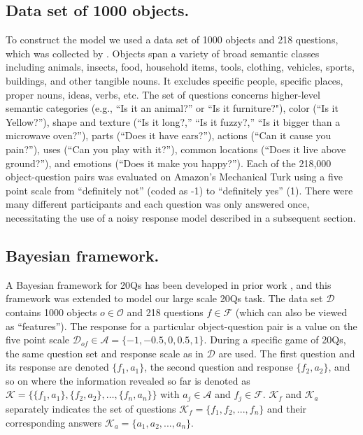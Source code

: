 \documentclass[11pt,letterpaper]{article}
\newcommand{\mc}[1]{\mathcal{#1}}
\begin{document}
\subsection* {Data set of 1000 objects.}
To construct the model we used a data set of 1000 objects and 218 questions, which was collected by \cite{Palatucci2009}.
Objects span a variety of broad semantic classes including animals, insects, food, household items, tools, clothing, vehicles, sports, buildings, and other tangible nouns.
It excludes specific people, specific places, proper nouns, ideas, verbs, etc.
The set of questions concerns higher-level semantic categories (e.g., ``Is it an animal?'' or ``Is it furniture?"), color (``Is it Yellow?''), shape and texture (``Is it long?,'' ``Is it fuzzy?,'' ``Is it bigger than a microwave oven?''), parts (``Does it have ears?''), actions (``Can it cause you pain?''), uses (``Can you play with it?''), common locations (``Does it live above ground?''), and emotions (``Does it make you happy?'').
Each of the 218,000 object-question pairs was evaluated on Amazon's Mechanical Turk using a five point scale from ``definitely not'' (coded as -1) to ``definitely yes'' (1).
There were many different participants and each question was only answered once, necessitating the use of a noisy response model described in a subsequent section.

\subsection* {Bayesian framework.}
A Bayesian framework for 20Qs has been developed in prior work \cite{Nelson2014,Ruggeri2015}, and this framework was extended to model our large scale 20Qs task.
The data set $\mc{D}$ contains 1000 objects $o \in \mc{O}$ and 218 questions $f \in \mc{F}$ (which can also be viewed as ``features''). 
The response for a particular object-question pair is a value on the five point scale $\mc{D}_{of} \in \mc{A} = \{-1, -0.5, 0, 0.5, 1\}$. 
During a specific game of 20Qs, the same question set and response scale as in $\mc{D}$ are used. 
The first question and its response are denoted $\{f_1, a_1\}$, the second question and response $\{f_2, a_2\}$, and so on where the information revealed so far is denoted as $\mc{K} = \{\{f_1, a_1\}, \{f_2, a_2\}, \dots, \{f_n, a_n\}\}$ with $a_j \in \mc{A}$ and $f_j \in \mc{F}$. $\mc{K}_f$ and $\mc{K}_a$ separately indicates the set of questions $\mc{K}_f = \{f_1, f_2, ... , f_n\}$ and their corresponding answers $\mc{K}_a = \{a_1, a_2, ... , a_n\}$.
\end{document}
